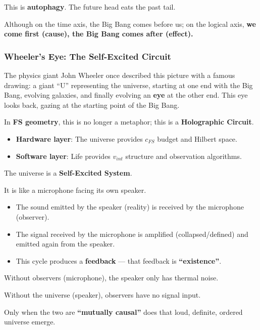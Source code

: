 This is \textbf{autophagy}. The future head eats the past tail.

Although on the time axis, the Big Bang comes before us; on the logical axis, \textbf{we come first (cause), the Big Bang comes after (effect).}

\subsubsection{Wheeler's Eye: The Self-Excited Circuit}

The physics giant John Wheeler once described this picture with a famous drawing: a giant ``U'' representing the universe, starting at one end with the Big Bang, evolving galaxies, and finally evolving an \textbf{eye} at the other end. This eye looks back, gazing at the starting point of the Big Bang.

In \textbf{FS geometry}, this is no longer a metaphor; this is a \textbf{Holographic Circuit}.

\begin{itemize}
\item \textbf{Hardware layer}: The universe provides $c_{FS}$ budget and Hilbert space.

\item \textbf{Software layer}: Life provides $v_{int}$ structure and observation algorithms.
\end{itemize}

The universe is a \textbf{Self-Excited System}.

It is like a microphone facing its own speaker.

\begin{itemize}
\item The sound emitted by the speaker (reality) is received by the microphone (observer).

\item The signal received by the microphone is amplified (collapsed/defined) and emitted again from the speaker.

\item This cycle produces a \textbf{feedback} --- that feedback is \textbf{``existence''}.
\end{itemize}

Without observers (microphone), the speaker only has thermal noise.

Without the universe (speaker), observers have no signal input.

Only when the two are \textbf{``mutually causal''} does that loud, definite, ordered universe emerge.

